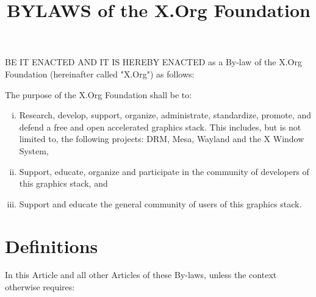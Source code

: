 \documentclass[10pt, english]{bylaws}
\begin{document}
\title{BYLAWS of the X.Org Foundation}
\maketitle
\date{}

BE IT ENACTED AND IT IS HEREBY ENACTED as a By-law of the X.Org Foundation
(hereinafter called "X.Org") as follows:


The purpose of the X.Org Foundation shall be to:
\begin{enumerate}[(i)\hspace{.2cm}]
	\item Research, develop, support, organize, administrate, standardize,
	promote, and defend a free and open accelerated graphics stack. This
	includes, but is not limited to, the following projects: DRM, Mesa,
	Wayland and the X Window System,

	\item Support, educate, organize and participate in the community of
	developers of this graphics stack, and

	\item Support and educate the general community of users of this
	graphics stack.
\end{enumerate}


\section{Definitions}
In this Article and all other Articles of these By-laws, unless the context
otherwise requires:
\end{document}
